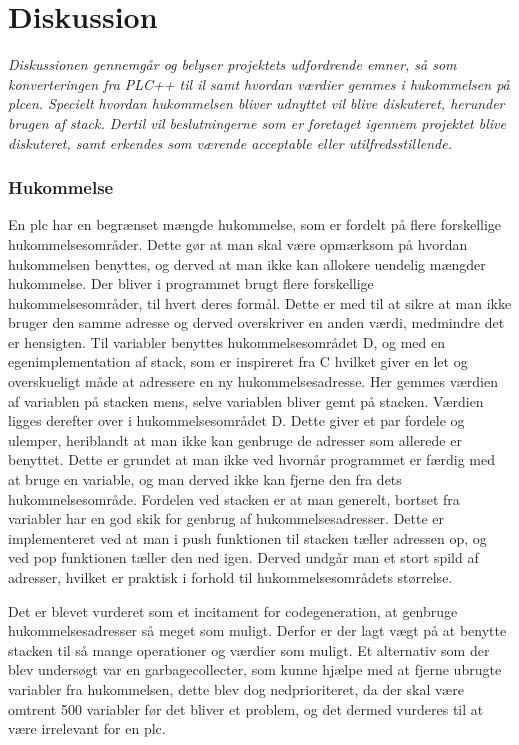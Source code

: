 \chapter{Diskussion}\label{sec:Diskussion}
\textit{Diskussionen gennemgår og belyser projektets udfordrende emner, så som konverteringen fra PLC++ til \gls{il} samt hvordan værdier gemmes i hukommelsen på \gls{plc}en.
Specielt hvordan hukommelsen bliver udnyttet vil blive diskuteret, herunder brugen af stack. 
Dertil vil beslutningerne som er foretaget igennem projektet blive diskuteret, samt erkendes som værende acceptable eller utilfredsstillende.}

\subsection*{Hukommelse}
En \gls{plc} har en begrænset mængde hukommelse, som er fordelt på flere forskellige hukommelsesområder.
Dette gør at man skal være opmærksom på hvordan hukommelsen benyttes, og derved at man ikke kan allokere uendelig mængder hukommelse.
Der bliver i programmet brugt flere forskellige hukommelsesområder, til hvert deres formål. Dette er med til at sikre at man ikke bruger den samme adresse og derved overskriver en anden værdi, medmindre det er hensigten.
Til variabler benyttes hukommelsesområdet D, og med en egenimplementation af stack, som er inspireret fra C hvilket giver en let og overskueligt måde at adressere en ny hukommelsesadresse.
Her gemmes værdien af variablen på stacken mens, selve variablen bliver gemt på stacken.
Værdien ligges derefter over i hukommelsesområdet D.
Dette giver et par fordele og ulemper, heriblandt at man ikke kan genbruge de adresser som allerede er benyttet. Dette er grundet at man ikke ved hvornår programmet er færdig med at bruge en variable, og man derved ikke kan fjerne den fra dets hukommelsesområde.
Fordelen ved stacken er at man generelt, bortset fra variabler har en god skik for genbrug af hukommelsesadresser.
Dette er implementeret ved at man i push funktionen til stacken tæller adressen op, og ved pop funktionen tæller den ned igen. Derved undgår man et stort spild af adresser, hvilket er praktisk i forhold til hukommelsesområdets størrelse.

Det er blevet vurderet som et incitament for codegeneration, at genbruge hukommelsesadresser så meget som muligt. Derfor er der lagt vægt på at benytte stacken til så mange operationer og værdier som muligt.
Et alternativ som der blev undersøgt var en garbagecollecter, som kunne hjælpe med at fjerne ubrugte variabler fra hukommelsen, dette blev dog nedprioriteret, da der skal være omtrent 500 variabler før det bliver et problem, og det dermed vurderes til at være irrelevant for en \gls{plc}.



